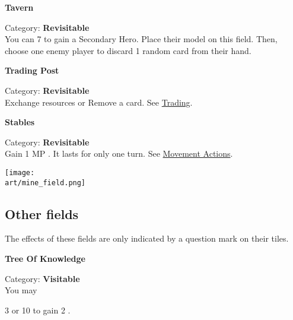 \begin{multicols}{2}
\medskip

\begin{minipage}{\linewidth}
  \begin{center}
    \textbf{Tavern}\medskip
  \end{center}
  \small{Category: \textbf{Revisitable}\\
    You can 
    7 
    to gain a Secondary Hero.
    Place their model on this field.
    Then, choose one enemy player to discard 1 random card from their hand.}
\end{minipage}

\medskip

\begin{minipage}{\linewidth}
  \begin{center}
    \hypertarget{Trading Post}{\textbf{Trading Post}}\medskip
  \end{center}
  \small{Category: \textbf{Revisitable}\\
    Exchange resources or Remove a card.
    See \protect\hyperlink{Trading}{Trading}.}
\end{minipage}

\medskip

\begin{minipage}{\linewidth}
  \begin{center}
    \textbf{Stables}\medskip
  \end{center}
  \small{Category: \textbf{Revisitable}\\
    Gain 1 MP .
    It lasts for only one turn.
    See \protect\hyperlink{Movement}{Movement Actions}.
  }
\end{minipage}

\vfill
\begin{center}
  \texttt{[image: \\art/mine\_field.png]}
\end{center}

\subsection*{Other fields}
The effects of these fields are only indicated by a question mark on their tiles.\par
\bigbreak

\begin{minipage}{\linewidth}
  \begin{center}
    \textbf{Tree Of Knowledge}\medskip
  \end{center}
  \small{Category: \textbf{Visitable}\\You may
    
     3  or
     10  to gain
     2 .}
\end{minipage}


\end{multicols}
